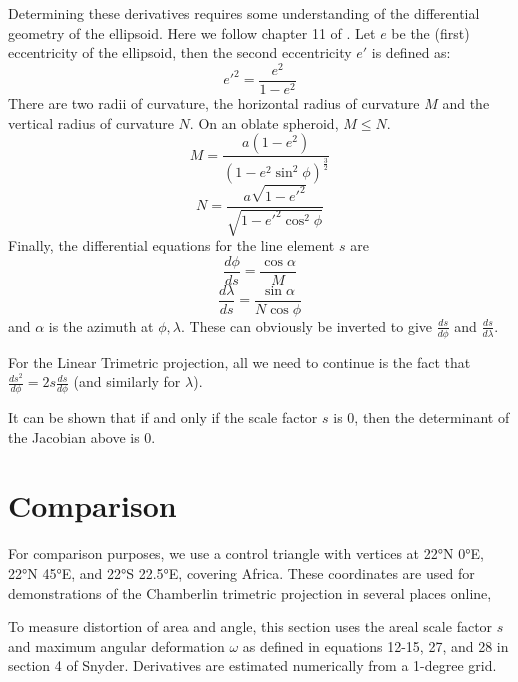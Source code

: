 \documentclass{amsart}[12pt]
\begin{document}
Determining these derivatives requires some understanding of the differential
geometry of the ellipsoid. Here we follow chapter 11 of \cite{strang12}.
Let $e$ be the (first) eccentricity of the ellipsoid, then the second
eccentricity $e'$ is defined as:
\begin{equation}
  e'^2 = \frac{e^2}{1-e^2}
\end{equation}
There are two radii of curvature, the horizontal radius of curvature $M$ and
the vertical radius of curvature $N$. On an oblate spheroid, $M \le N$.
\begin{equation}
  M = \frac{a\left(1-e^2\right)}{\left(1-e^2 \sin^2 \phi\right)^{\frac{3}{2}}}
\end{equation}
\begin{equation}
  N = \frac{a\sqrt{1-e'^2}}{\sqrt{1-e'^2 \cos^2 \phi}}
\end{equation}
Finally, the differential equations for the line element $s$ are
\begin{equation}
  \frac{d \phi}{d s} = \frac{\cos \alpha}{M}
\end{equation}
\begin{equation}
  \frac{d \lambda}{d s} = \frac{\sin \alpha}{N \cos \phi}
\end{equation}
and $\alpha$ is the azimuth at $\phi, \lambda$. These can obviously be inverted
to give $\frac{d s}{d \phi}$ and $\frac{d s}{d \lambda}$.

For the Linear Trimetric projection, all we need to continue is the fact that
$\frac{d s^2}{d \phi} = 2 s \frac{ds}{d \phi}$ (and similarly for $\lambda$).



It can be shown that if and only if the scale factor $s$ is 0, then the determinant of the Jacobian above is 0.

\section{Comparison}
For comparison purposes, we use a control triangle with vertices at 22°N 0°E,
22°N 45°E, and 22°S 22.5°E, covering Africa. These coordinates are used for
demonstrations of the Chamberlin trimetric projection in several places online,

To measure distortion of area and angle, this section uses the areal scale
factor $s$ and maximum angular deformation $\omega$ as defined in equations
12-15, 27, and 28 in section 4 of Snyder.\cite{snyder87} Derivatives are
estimated numerically from a 1-degree grid.
\end{document}
